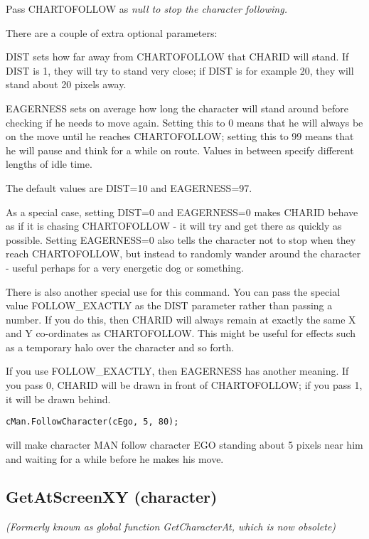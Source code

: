 Pass CHARTOFOLLOW as \it{null} to stop the character following.

There are a couple of extra optional parameters:

DIST sets how far away from CHARTOFOLLOW that CHARID will
stand. If DIST is 1, they will try to stand very close; if DIST is for
example 20, they will stand about 20 pixels away.

EAGERNESS sets on average how long the character will stand around before
checking if he needs to move again. Setting this to 0 means that he will
always be on the move until he reaches CHARTOFOLLOW; setting this to 99
means that he will pause and think for a while on route. Values in between
specify different lengths of idle time.

The default values are DIST=10 and EAGERNESS=97.

As a special case, setting DIST=0 and EAGERNESS=0 makes CHARID behave as if
it is chasing CHARTOFOLLOW - it will try and get there as quickly as possible.
Setting EAGERNESS=0 also tells the character not to stop when they reach
CHARTOFOLLOW, but instead to randomly wander around the character - useful
perhaps for a very energetic dog or something.

There is also another special use for this command. You can pass the special
value FOLLOW_EXACTLY as the DIST parameter rather than passing a number. If you
do this, then CHARID will always remain at exactly the same X and Y co-ordinates
as CHARTOFOLLOW. This might be useful for effects such as a temporary halo over
the character and so forth.

If you use FOLLOW_EXACTLY, then EAGERNESS has another meaning. If you pass 0, CHARID
will be drawn in front of CHARTOFOLLOW; if you pass 1, it will be drawn behind.

\begin{verbatim}
cMan.FollowCharacter(cEgo, 5, 80);
\end{verbatim}
will make character MAN follow character EGO standing about 5 pixels near
him and waiting for a while before he makes his move.


\subsection{GetAtScreenXY (character)}\label{Character.GetAtScreenXY}%

\it{(Formerly known as global function GetCharacterAt, which is now obsolete)}

